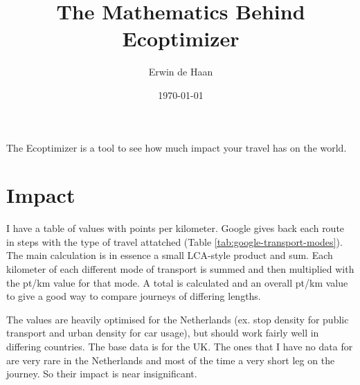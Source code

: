 \documentclass[final,a4paper,11pt]{article}
\author{Erwin de Haan}
\title{The Mathematics Behind Ecoptimizer}
\date{\today}
\begin{document}
\maketitle
The Ecoptimizer is a tool to see how much impact your travel has on the world.
\section{Impact}
I have a table of values with points per kilometer. Google gives back each route in steps with the type of travel attatched (Table \ref{tab:google-transport-modes}).
The main calculation is in essence a small LCA-style product and sum.
Each kilometer of each different mode of transport is summed and then multiplied with the pt/km value for that mode.
A total is calculated and an overall pt/km value to give a good way to compare journeys of differing lengths.

The values are heavily optimised for the Netherlands (ex. stop density for public transport and urban density for car usage), but should work fairly well in differing countries. The base data is for the UK. The ones that I have no data for are very rare in the Netherlands and most of the time a very short leg on the journey. So their impact is near insignificant.
\end{document}
